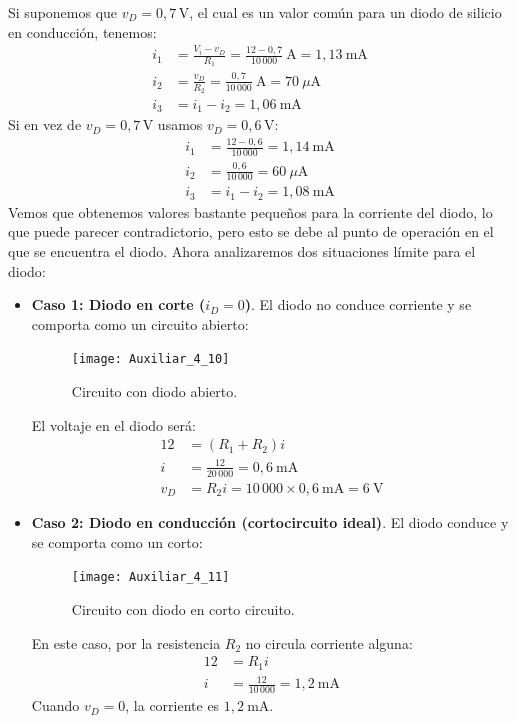 \documentclass[
  11pt,
  letterpaper,
   addpoints,
  ]{exam}
\begin{document}
\begin{questions}
\begin{solution}
 Si suponemos que $v_D = 0{,}7\,\mathrm{V}$, el cual es un valor común para un diodo de silicio en conducción, tenemos:
  \begin{align*}
    i_1 &= \frac{V_i - v_D}{R_1} = \frac{12 - 0{,}7}{10\,000}\ \mathrm{A} = 1{,}13\ \mathrm{mA} \\
    i_2 &= \frac{v_D}{R_2} = \frac{0{,}7}{10\,000}\ \mathrm{A} = 70\ \mu\mathrm{A} \\
    i_3 &= i_1 - i_2 = 1{,}06\ \mathrm{mA}
  \end{align*}
  Si en vez de $v_D = 0{,}7\,\mathrm{V}$ usamos $v_D = 0{,}6\,\mathrm{V}$:
  \begin{align*}
    i_1 &= \frac{12 - 0{,}6}{10\,000} = 1{,}14\ \mathrm{mA} \\
    i_2 &= \frac{0{,}6}{10\,000} = 60\ \mu\mathrm{A} \\
    i_3 &= i_1 - i_2 = 1{,}08\ \mathrm{mA}
  \end{align*}
Vemos que obtenemos valores bastante pequeños para la corriente del diodo, lo que puede parecer contradictorio, pero esto se debe al punto de operación en el que se encuentra el diodo. Ahora analizaremos dos situaciones límite para el diodo:
\begin{itemize}
    \item \textbf{Caso 1: Diodo en corte ($i_D = 0$)}. El diodo no conduce corriente y se comporta como un circuito abierto:
    \begin{figure}[H]
      \centering
      \texttt{[image: Auxiliar\_4\_10]}
      \caption{Circuito con diodo abierto.}
      \label{fig:th_norton_2}
    \end{figure}
  El voltaje en el diodo será:
    \begin{align*}
        12 &= (R_1 + R_2)i \\
        i &= \frac{12}{20\,000} = 0{,}6\ \mathrm{mA} \\
        v_D &= R_2 i = 10\,000 \times 0{,}6\ \mathrm{mA} = 6\ \mathrm{V}
    \end{align*}
    \item \textbf{Caso 2: Diodo en conducción (cortocircuito ideal)}. El diodo conduce y se comporta como un corto:
    \begin{figure}[H]
      \centering
      \texttt{[image: Auxiliar\_4\_11]}
      \caption{Circuito con diodo en corto circuito.}
      \label{fig:th_norton_3}
    \end{figure}
  En este caso, por la resistencia $R_2$ no circula corriente alguna:
    \begin{align*}
        12 &= R_1 i \\
        i &= \frac{12}{10\,000} = 1{,}2\ \mathrm{mA}
    \end{align*}
    Cuando $v_D = 0$, la corriente es $1{,}2\ \mathrm{mA}$.
\end{itemize}


\end{solution}
\end{questions}
\end{document}
